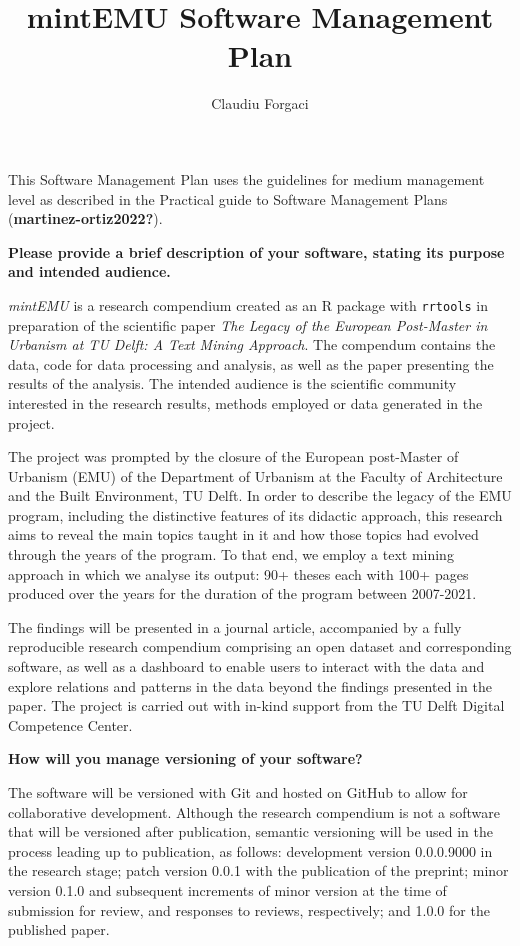 \documentclass[
  letterpaper,
  DIV=11,
  numbers=noendperiod]{scrartcl}
\title{mintEMU Software Management Plan}
\author{Claudiu Forgaci}
\date{}
\begin{document}
\maketitle
\ifdefined\Shaded\renewenvironment{Shaded}{\begin{tcolorbox}[frame hidden, borderline west={3pt}{0pt}{shadecolor}, enhanced, boxrule=0pt, sharp corners, interior hidden, breakable]}{\end{tcolorbox}}\fi

This Software Management Plan uses the guidelines for medium management
level as described in the Practical guide to Software Management Plans
(\textbf{martinez-ortiz2022?}).

\textbf{Please provide a brief description of your software, stating its
purpose and intended audience.}

\emph{mintEMU} is a research compendium created as an R package with
\texttt{rrtools} in preparation of the scientific paper \emph{The Legacy
of the European Post-Master in Urbanism at TU Delft: A Text Mining
Approach}. The compendum contains the data, code for data processing and
analysis, as well as the paper presenting the results of the analysis.
The intended audience is the scientific community interested in the
research results, methods employed or data generated in the project.

The project was prompted by the closure of the European post-Master of
Urbanism (EMU) of the Department of Urbanism at the Faculty of
Architecture and the Built Environment, TU Delft. In order to describe
the legacy of the EMU program, including the distinctive features of its
didactic approach, this research aims to reveal the main topics taught
in it and how those topics had evolved through the years of the program.
To that end, we employ a text mining approach in which we analyse its
output: 90+ theses each with 100+ pages produced over the years for the
duration of the program between 2007-2021.

The findings will be presented in a journal article, accompanied by a
fully reproducible research compendium comprising an open dataset and
corresponding software, as well as a dashboard to enable users to
interact with the data and explore relations and patterns in the data
beyond the findings presented in the paper. The project is carried out
with in-kind support from the TU Delft Digital Competence Center.

\textbf{How will you manage versioning of your software?}

The software will be versioned with Git and hosted on GitHub to allow
for collaborative development. Although the research compendium is not a
software that will be versioned after publication, semantic versioning
will be used in the process leading up to publication, as follows:
development version 0.0.0.9000 in the research stage; patch version
0.0.1 with the publication of the preprint; minor version 0.1.0 and
subsequent increments of minor version at the time of submission for
review, and responses to reviews, respectively; and 1.0.0 for the
published paper.
\end{document}
